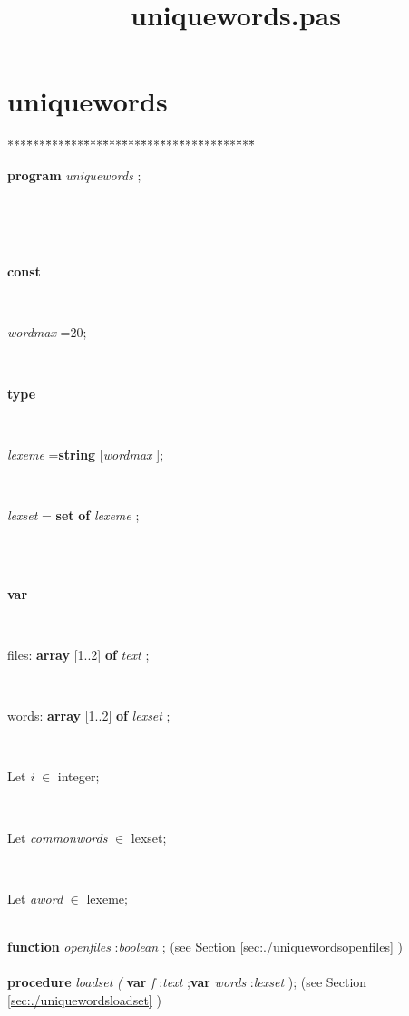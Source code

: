 \documentclass[10pt, a4paper]{article}
\title{uniquewords.pas}
\begin{document}
\maketitle

\tableofcontents
\section{uniquewords}
\begin{tabbing}
***\=***\=***\=***\=***\=***\=***\=***\=***\=***\=***\=***\=***\=\kill
\\
\parbox{14cm}{\textsf{\textbf{program}  \textit{uniquewords} ;}}\\
\\
\\
\+\parbox{14cm}{\textsf{\textbf{const} }}\\
\parbox{14cm}{\textsf{\textit{wordmax} =20;}}\\
\<\parbox{14cm}{\textsf{\textbf{type} }}\\
\parbox{14cm}{\textsf{\textit{lexeme} =\textbf{string} [\textit{wordmax} ];}}\\
\parbox{14cm}{\textsf{\textit{lexset} = \textbf{set}  \textbf{of}  \textit{lexeme} ;}}\\
\\
\<\parbox{14cm}{\textsf{\textbf{var} }}\\
\parbox{14cm}{files: \textbf{ array } \textsf{[1..2] } \textbf{ of } \textsf{ \textit{text} ;}}\\
\parbox{14cm}{words: \textbf{ array } \textsf{[1..2] } \textbf{ of } \textsf{ \textit{lexset} ;}}\\
\parbox{14cm}{\textsf{Let \textit{i} $\in$ integer;}}\\
\parbox{14cm}{\textsf{Let \textit{commonwords} $\in$ lexset;}}\\
\parbox{14cm}{\textsf{Let \textit{aword} $\in$ lexeme;}}\\
\<\textsf{\textbf{function}  \textit{openfiles} :\textit{boolean} ;} (see Section \ref{sec:./uniquewordsopenfiles} )\\
\\
\<\textsf{\textbf{procedure}  \textit{loadset} \textit{(} \textbf{var}  \textit{f} :\textit{text} ;\textbf{var}  \textit{words} :\textit{lexset} );} (see Section \ref{sec:./uniquewordsloadset} )\\
\\
\\
\\
\\
\end{tabbing}
\end{document}
